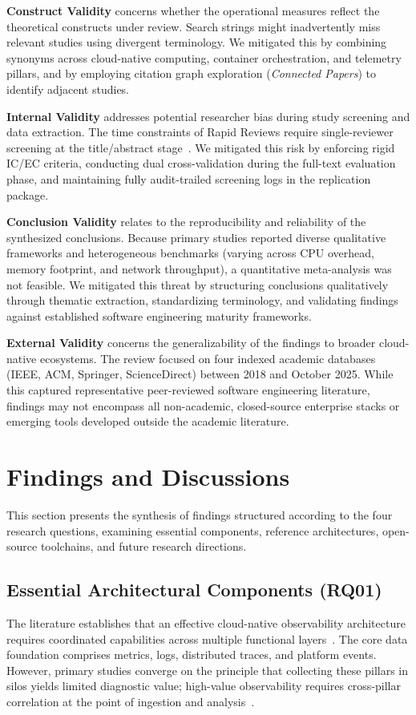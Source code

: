 \documentclass[sigconf, anonymous, balance=false]{acmart}
\begin{document}
\textbf{Construct Validity} concerns whether the operational measures reflect the theoretical constructs under review. Search strings might inadvertently miss relevant studies using divergent terminology. We mitigated this by combining synonyms across cloud-native computing, container orchestration, and telemetry pillars, and by employing citation graph exploration (\textit{Connected Papers}) to identify adjacent studies.

\textbf{Internal Validity} addresses potential researcher bias during study screening and data extraction. The time constraints of Rapid Reviews require single-reviewer screening at the title/abstract stage~\cite{cartaxo_2018}. We mitigated this risk by enforcing rigid IC/EC criteria, conducting dual cross-validation during the full-text evaluation phase, and maintaining fully audit-trailed screening logs in the replication package.

\textbf{Conclusion Validity} relates to the reproducibility and reliability of the synthesized conclusions. Because primary studies reported diverse qualitative frameworks and heterogeneous benchmarks (varying across CPU overhead, memory footprint, and network throughput), a quantitative meta-analysis was not feasible. We mitigated this threat by structuring conclusions qualitatively through thematic extraction, standardizing terminology, and validating findings against established software engineering maturity frameworks.

\textbf{External Validity} concerns the generalizability of the findings to broader cloud-native ecosystems. The review focused on four indexed academic databases (IEEE, ACM, Springer, ScienceDirect) between 2018 and October 2025. While this captured representative peer-reviewed software engineering literature, findings may not encompass all non-academic, closed-source enterprise stacks or emerging tools developed outside the academic literature.

\section{Findings and Discussions}
\label{sec:findings}

This section presents the synthesis of findings structured according to the four research questions, examining essential components, reference architectures, open-source toolchains, and future research directions.

\subsection{Essential Architectural Components (RQ01)}
The literature establishes that an effective cloud-native observability architecture requires coordinated capabilities across multiple functional layers~\cite{kosinska_2023, usman_2022, faseeha_2025}. The core data foundation comprises metrics, logs, distributed traces, and platform events. However, primary studies converge on the principle that collecting these pillars in silos yields limited diagnostic value; high-value observability requires cross-pillar correlation at the point of ingestion and analysis~\cite{gomes_2025, araujo_24}.
\end{document}
